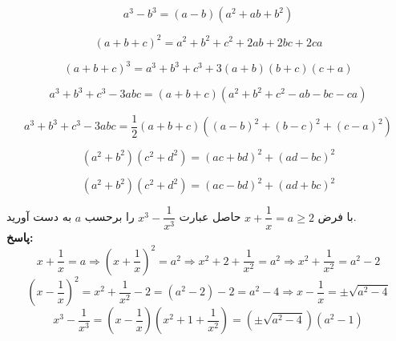 \begin{equation}
	a^3-b^3 = (a-b)(a^2+ab+b^2)
\end{equation}

\begin{equation}
	(a+b+c)^2 = a^2+b^2+c^2+2ab+2bc+2ca
\end{equation}

\begin{equation}
	(a+b+c)^3 = a^3+b^3+c^3+3(a+b)(b+c)(c+a)
\end{equation}

\begin{equation}
	a^3+b^3+c^3 -3abc = (a+b+c)(a^2+b^2+c^2-ab-bc-ca)
\end{equation}

\begin{equation}
	a^3+b^3+c^3 -3abc = \frac{1}{2}(a+b+c)\left((a-b)^2+(b-c)^2+(c-a)^2\right)
\end{equation}

\begin{equation}
	(a^2+b^2)(c^2+d^2) = (ac+bd)^2 + (ad-bc)^2
\end{equation}

\begin{equation}
	(a^2+b^2)(c^2+d^2) = (ac-bd)^2 + (ad+bc)^2
\end{equation}

\begin{example}
	با فرض
	$x+\dfrac{1}{x}=a \geq 2$
	حاصل عبارت
	$x^3 -\dfrac{1}{x^3}$
	را برحسب $a$ به دست آورید. \\
	\textbf{پاسخ:}
	\[
	x+\frac{1}{x}=a \Rightarrow \left(x+\frac{1}{x}\right)^2=a^2 \Rightarrow x^2+2+\frac{1}{x^2}=a^2 \Rightarrow x^2+\frac{1}{x^2}=a^2-2
	\]
	\[
	\left(x-\frac{1}{x}\right)^2=x^2+\frac{1}{x^2}-2=\left(a^2-2\right)-2=a^2-4 \Rightarrow x-\frac{1}{x}=\pm \sqrt{a^2-4}
	\]
	\[
	x^3-\frac{1}{x^3}=\left(x-\frac{1}{x}\right)\left(x^2+1+\frac{1}{x^2}\right) = \left(\pm \sqrt{a^2-4}\right)\left(a^2-1\right)
	\]
\end{example}
